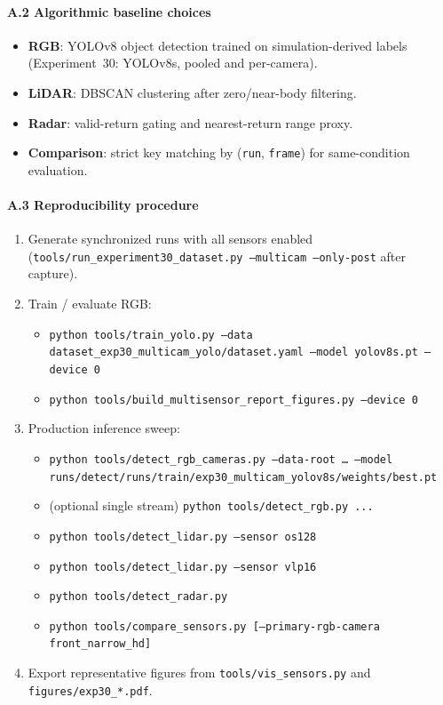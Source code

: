 \paragraph{A.2 Algorithmic baseline choices}
\begin{itemize}
  \item \textbf{RGB}: YOLOv8 object detection trained on simulation-derived labels (Experiment~30: YOLOv8s, pooled and per-camera).
  \item \textbf{LiDAR}: DBSCAN clustering after zero/near-body filtering.
  \item \textbf{Radar}: valid-return gating and nearest-return range proxy.
  \item \textbf{Comparison}: strict key matching by (\texttt{run}, \texttt{frame}) for same-condition evaluation.
\end{itemize}

\paragraph{A.3 Reproducibility procedure}
\begin{enumerate}
  \item Generate synchronized runs with all sensors enabled (\texttt{tools/run\_experiment30\_dataset.py --multicam --only-post} after capture).
  \item Train / evaluate RGB:
  \begin{itemize}
    \item \texttt{python tools/train\_yolo.py --data dataset\_exp30\_multicam\_yolo/dataset.yaml --model yolov8s.pt --device 0}
    \item \texttt{python tools/build\_multisensor\_report\_figures.py --device 0}
  \end{itemize}
  \item Production inference sweep:
  \begin{itemize}
    \item \texttt{python tools/detect\_rgb\_cameras.py --data-root \ldots{} --model runs/detect/runs/train/exp30\_multicam\_yolov8s/weights/best.pt}
    \item (optional single stream) \texttt{python tools/detect\_rgb.py ...}
    \item \texttt{python tools/detect\_lidar.py --sensor os128}
    \item \texttt{python tools/detect\_lidar.py --sensor vlp16}
    \item \texttt{python tools/detect\_radar.py}
    \item \texttt{python tools/compare\_sensors.py [--primary-rgb-camera front\_narrow\_hd]}
  \end{itemize}
  \item Export representative figures from \texttt{tools/vis\_sensors.py} and \texttt{figures/exp30\_*.pdf}.
\end{enumerate}

